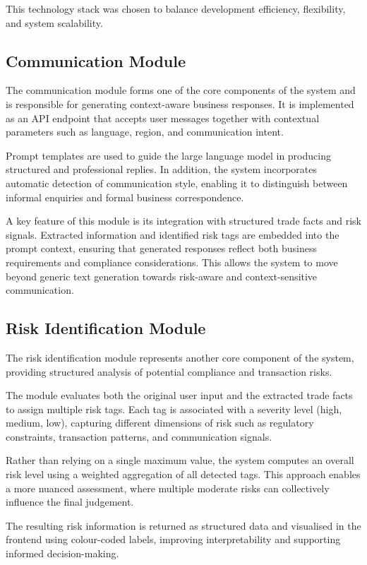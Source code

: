 \documentclass[12pt,a4paper]{report}
\begin{document}
This technology stack was chosen to balance development efficiency, flexibility, and system scalability.

\subsection{Communication Module}

The communication module forms one of the core components of the system and is responsible for generating context-aware business responses. It is implemented as an API endpoint that accepts user messages together with contextual parameters such as language, region, and communication intent.

Prompt templates are used to guide the large language model in producing structured and professional replies. In addition, the system incorporates automatic detection of communication style, enabling it to distinguish between informal enquiries and formal business correspondence.

A key feature of this module is its integration with structured trade facts and risk signals. Extracted information and identified risk tags are embedded into the prompt context, ensuring that generated responses reflect both business requirements and compliance considerations. This allows the system to move beyond generic text generation towards risk-aware and context-sensitive communication.

\subsection{Risk Identification Module}

The risk identification module represents another core component of the system, providing structured analysis of potential compliance and transaction risks.

The module evaluates both the original user input and the extracted trade facts to assign multiple risk tags. Each tag is associated with a severity level (high, medium, low), capturing different dimensions of risk such as regulatory constraints, transaction patterns, and communication signals.

Rather than relying on a single maximum value, the system computes an overall risk level using a weighted aggregation of all detected tags. This approach enables a more nuanced assessment, where multiple moderate risks can collectively influence the final judgement.

The resulting risk information is returned as structured data and visualised in the frontend using colour-coded labels, improving interpretability and supporting informed decision-making.
\end{document}
